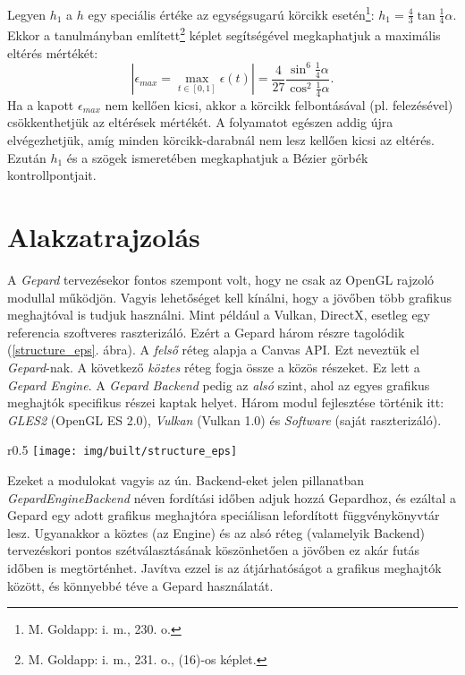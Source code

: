\documentclass[12pt]{report}
\theoremstyle{definition}
\newcommand{\func}[1]{{\textsl{#1}}}
\newcommand{\melyikoldalra}{r}
\begin{document}
Legyen $h_1$ a $h$ egy speciális értéke az egységsugarú körcikk
esetén\footnote{M. Goldapp: i. m., 230. o.}: $h_1 = \frac{4}{3} \tan{\frac{1}{4}
\alpha}$. Ekkor a \cite[Goldapp]{Goldapp:1991:approximation} tanulmányban
említett\footnote{M.  Goldapp: i. m., 231. o., (16)-os képlet.} képlet
segítségével megkaphatjuk a maximális eltérés mértékét: \begin{equation}
\label{eq:2} |\epsilon_{max} = \max_{{t\in[0, 1]}} \epsilon(t)| = \frac{4}{27}
\frac{\sin^6{\frac{1}{4} \alpha}}{\cos^2{\frac{1}{4} \alpha}}. \end{equation} Ha
a kapott $\epsilon_{max}$ nem kellően kicsi, akkor a körcikk felbontásával (pl.
felezésével) csökkenthetjük az eltérések mértékét. A folyamatot egészen addig
újra elvégezhetjük, amíg minden körcikk-darabnál nem lesz kellően kicsi az
eltérés. Ezután $h_1$ és a szögek ismeretében megkaphatjuk a Bézier görbék
kontrollpontjait.



    \chapter{Alakzatrajzolás}

A \emph{Gepard} tervezésekor fontos szempont volt, hogy ne csak az OpenGL
rajzoló modullal működjön. Vagyis lehetőséget kell kínálni, hogy a jövőben több
grafikus meghajtóval is tudjuk használni. Mint például a Vulkan, DirectX,
esetleg egy referencia szoftveres raszterizáló. Ezért a Gepard három részre
tagolódik (\ref{structure_eps}. ábra). A \emph{felső} réteg alapja a Canvas API.
Ezt neveztük el \emph{Gepard}-nak. A következő \emph{köztes} réteg fogja össze a
közös részeket. Ez lett a \emph{Gepard Engine}. A \emph{Gepard Backend} pedig az
\emph{alsó} szint, ahol az egyes grafikus meghajtók specifikus részei kaptak
helyet. Három modul fejlesztése történik itt: \emph{GLES2} (OpenGL ES 2.0),
\emph{Vulkan} (Vulkan 1.0) és \emph{Software} (saját raszterizáló).
  \begin{wrapfigure}{\melyikoldalra}{0.5\textwidth}
    \texttt{[image: img/built/structure\_eps]}
    \caption{\label{structure_eps} A három fő réteg}
  \end{wrapfigure}
Ezeket a modulokat vagyis az ún. Backend-eket jelen pillanatban
\func{GepardEngineBackend} néven fordítási időben adjuk hozzá Gepardhoz, és
ezáltal a Gepard egy adott grafikus meghajtóra speciálisan lefordított
függvénykönyvtár lesz. Ugyanakkor a köztes (az Engine) és az alsó réteg
(valamelyik Backend) tervezéskori pontos szétválasztásának köszönhetően a
jövőben ez akár futás időben is megtörténhet. Javítva ezzel is az átjárhatóságot
a grafikus meghajtók között, és könnyebbé téve a Gepard használatát.
\end{document}
